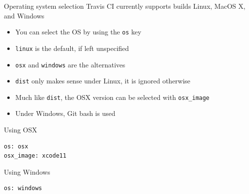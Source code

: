 \documentclass[presentation]{beamer}
\begin{document}
\begin{frame}[fragile]{Operating system selection}
    Travis CI currently supports builds Linux, MacOS X, and Windows
    \begin{itemize}
        \item You can select the OS by using the \texttt{os} key
        \item \texttt{linux} is the default, if left unspecified
        \item \texttt{osx} and \texttt{windows} are the alternatives
        \item \texttt{dist} only makes sense under Linux, it is ignored otherwise
        \item Much like \texttt{dist}, the OSX version can be selected with \texttt{osx\_image}
        \item Under Windows, Git bash is used
    \end{itemize}
    \begin{block}{Using OSX}
         \begin{verbatim}
os: osx
osx_image: xcode11
         \end{verbatim}
    \end{block}
    \begin{block}{Using Windows}
         \begin{verbatim}
os: windows
         \end{verbatim}
    \end{block}
\end{frame}
\end{document}
